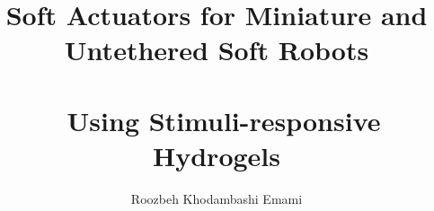 \documentclass[12pt,letterpaper]{report}
\begin{document}
\title{Soft Actuators for Miniature and Untethered Soft Robots\\\\\ Using Stimuli-responsive Hydrogels}
\author{Roozbeh Khodambashi Emami}
\maketitle
\doublespace

%
\tableofcontents
\newpage

%
%

\end{document}
